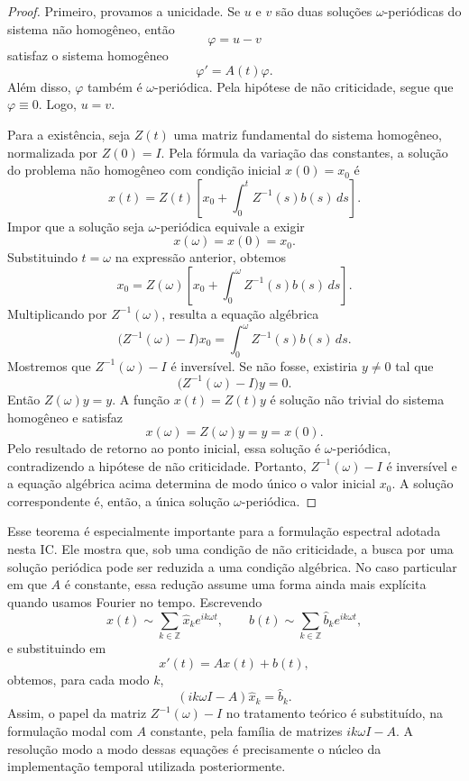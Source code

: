 \begin{proof}
Primeiro, provamos a unicidade. Se \(u\) e \(v\) são duas soluções \(\omega\)-periódicas do sistema não homogêneo, então
\[
\varphi=u-v
\]
satisfaz o sistema homogêneo
\[
\varphi'=A(t)\varphi.
\]
Além disso, \(\varphi\) também é \(\omega\)-periódica. Pela hipótese de não criticidade, segue que \(\varphi\equiv0\). Logo, \(u=v\).

Para a existência, seja \(Z(t)\) uma matriz fundamental do sistema homogêneo, normalizada por \(Z(0)=I\). Pela fórmula da variação das constantes, a solução do problema não homogêneo com condição inicial \(x(0)=x_0\) é
\[
x(t)=Z(t)\left[x_0+\int_0^t Z^{-1}(s)b(s)\,ds\right].
\]
Impor que a solução seja \(\omega\)-periódica equivale a exigir
\[
x(\omega)=x(0)=x_0.
\]
Substituindo \(t=\omega\) na expressão anterior, obtemos
\[
x_0=Z(\omega)\left[x_0+\int_0^\omega Z^{-1}(s)b(s)\,ds\right].
\]
Multiplicando por \(Z^{-1}(\omega)\), resulta a equação algébrica
\[
\bigl(Z^{-1}(\omega)-I\bigr)x_0
=
\int_0^\omega Z^{-1}(s)b(s)\,ds.
\]
Mostremos que \(Z^{-1}(\omega)-I\) é inversível. Se não fosse, existiria \(y\neq0\) tal que
\[
\bigl(Z^{-1}(\omega)-I\bigr)y=0.
\]
Então \(Z(\omega)y=y\). A função \(x(t)=Z(t)y\) é solução não trivial do sistema homogêneo e satisfaz
\[
x(\omega)=Z(\omega)y=y=x(0).
\]
Pelo resultado de retorno ao ponto inicial, essa solução é \(\omega\)-periódica, contradizendo a hipótese de não criticidade. Portanto, \(Z^{-1}(\omega)-I\) é inversível e a equação algébrica acima determina de modo único o valor inicial \(x_0\). A solução correspondente é, então, a única solução \(\omega\)-periódica.
\end{proof}

Esse teorema é especialmente importante para a formulação espectral adotada nesta IC. Ele mostra que, sob uma condição de não criticidade, a busca por uma solução periódica pode ser reduzida a uma condição algébrica. No caso particular em que \(A\) é constante, essa redução assume uma forma ainda mais explícita quando usamos Fourier no tempo. Escrevendo
\[
x(t)\sim\sum_{k\in\mathbb{Z}}\widehat{x}_k e^{ik\omega t},
\qquad
b(t)\sim\sum_{k\in\mathbb{Z}}\widehat{b}_k e^{ik\omega t},
\]
e substituindo em
\[
x'(t)=Ax(t)+b(t),
\]
obtemos, para cada modo \(k\),
\[
(ik\omega I-A)\widehat{x}_k=\widehat{b}_k.
\]
Assim, o papel da matriz \(Z^{-1}(\omega)-I\) no tratamento teórico é substituído, na formulação modal com \(A\) constante, pela família de matrizes \(ik\omega I-A\). A resolução modo a modo dessas equações é precisamente o núcleo da implementação temporal utilizada posteriormente.

